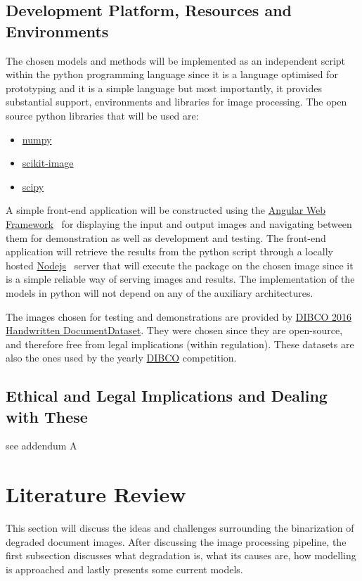 \documentclass[a4paper, 12pt]{report}
\begin{document}
\section{Development Platform, Resources and Environments}
The chosen models and methods will be implemented as an independent script within the python programming language since it is a language optimised for prototyping and it is a simple language but most importantly, it provides substantial support, environments and libraries for image processing. The open source python libraries that will be used are:
\begin{itemize}
    \item \href{https://numpy.org/}{numpy}~\cite{numpy}
    \item \href{https://scikit-image.org/}{scikit-image}~\cite{scikit-image}
    \item \href{https://scikit-image.org/}{scipy}~\cite{2020SciPy-NMeth}
\end{itemize}

A simple front-end application will be constructed using the \href{https://angular.io/}{Angular Web Framework}~\cite{angular_2022} for displaying the input and output images and navigating between them for demonstration as well as development and testing. The front-end application will retrieve the results from the python script through a locally hosted \href{https://nodejs.org/en/}{Nodejs}~\cite{nodejs_2022} server that will execute the package on the chosen image since it is a simple reliable way of serving images and results. The implementation of the models in python will not depend on any of the auxiliary architectures. \par

The images chosen for testing and demonstrations are provided by \href{https://vc.ee.duth.gr/h-dibco2016/}{DIBCO 2016 Handwritten DocumentDataset}. They were chosen since they are open-source, and therefore free from legal implications (within regulation). These datasets are also the ones used by the yearly \href{https://dib.cin.ufpe.br/#!/resources/dibco}{DIBCO} competition.

\section{Ethical and Legal Implications and Dealing with These}
see addendum A

\chapter{Literature Review}
This section will discuss the ideas and challenges surrounding the binarization of degraded document images. After discussing the image processing pipeline, the first subsection discusses what degradation is, what its causes are, how modelling is approached and lastly presents some current models.
\end{document}
